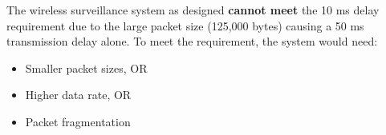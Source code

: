 \documentclass[12pt,a4paper]{article}
\begin{document}
\vspace{1em}

\begin{tcolorbox}[colback=red!5!white, colframe=red!50!black, title=Important Note for Scenario 2]
The wireless surveillance system as designed \textbf{cannot meet} the 10 ms delay requirement due to the large packet size (125,000 bytes) causing a 50 ms transmission delay alone. To meet the requirement, the system would need:
\begin{itemize}
    \item Smaller packet sizes, OR
    \item Higher data rate, OR
    \item Packet fragmentation
\end{itemize}
\end{tcolorbox}
\end{document}
